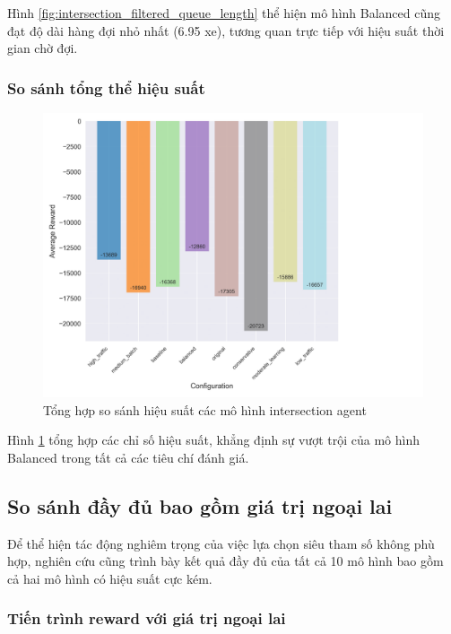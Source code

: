 Hình \ref{fig:intersection_filtered_queue_length} thể hiện mô hình Balanced cũng
đạt độ dài hàng đợi nhỏ nhất (6.95 xe), tương quan trực tiếp với hiệu suất thời
gian chờ đợi.

\subsubsection{So sánh tổng thể hiệu suất}

\begin{figure}[!htp]
    \centering
    \includegraphics[width=\textwidth]{
        figures/individual_plots/intersection_filtered_performance_summary.png
    }
    \caption{Tổng hợp so sánh hiệu suất các mô hình intersection agent}
    \label{fig:intersection_filtered_performance_summary}
\end{figure}

Hình \ref{fig:intersection_filtered_performance_summary} tổng hợp các chỉ số
hiệu suất, khẳng định sự vượt trội của mô hình Balanced trong tất cả các tiêu chí
đánh giá.

\subsection{So sánh đầy đủ bao gồm giá trị ngoại lai}

Để thể hiện tác động nghiêm trọng của việc lựa chọn siêu tham số không phù hợp,
nghiên cứu cũng trình bày kết quả đầy đủ của tất cả 10 mô hình bao gồm cả hai mô
hình có hiệu suất cực kém.

\subsubsection{Tiến trình reward với giá trị ngoại lai}


